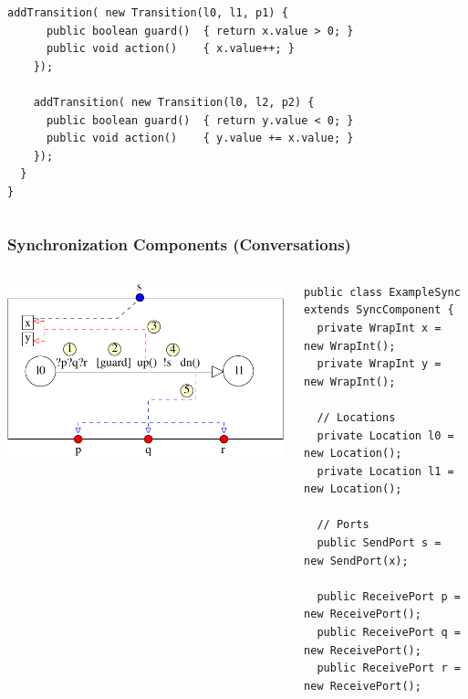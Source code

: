 \documentclass[compress,xcolor=dvipsnames,10pt]{beamer}
\begin{document}
\begin{frame}[fragile]
\begin{columns}
\begin{column}{0.55\linewidth}
\begin{lstlisting}[style=customjava, basicstyle=\ttfamily\tiny]
    addTransition( new Transition(l0, l1, p1) {
      public boolean guard()  { return x.value > 0; }
      public void action()    { x.value++; }
    });
     
    addTransition( new Transition(l0, l2, p2) {
      public boolean guard()  { return y.value < 0; }
      public void action()    { y.value += x.value; }
    });
  }
}
\end{lstlisting}
  \end{column}
 \end{columns}
\end{frame}

\begin{frame}[fragile]
\frametitle{Synchronization Components (Conversations)}
\begin{columns}
 \begin{column}{0.45\linewidth}
  \begin{center}
 \includegraphics[scale=0.5]{figs/synccomponent.pdf}
\end{center}
  \end{column}
   \begin{column}{0.55\linewidth}
   \begin{lstlisting}[style=customjava, basicstyle=\ttfamily\tiny]
public class ExampleSync extends SyncComponent {
  private WrapInt x = new WrapInt();
  private WrapInt y = new WrapInt();
  
  // Locations
  private Location l0 = new Location();
  private Location l1 = new Location();
   
  // Ports
  public SendPort s = new SendPort(x);
  
  public ReceivePort p = new ReceivePort();
  public ReceivePort q = new ReceivePort();
  public ReceivePort r = new ReceivePort();


\end{lstlisting}
\end{column}
\end{columns}
\end{frame}
\end{document}
